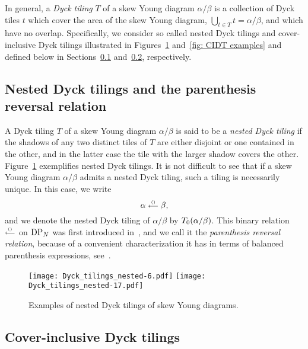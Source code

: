 \documentclass[oneside,english]{amsart}
\numberwithin{equation}{section}
\numberwithin{figure}{section}
\theoremstyle{plain}
\theoremstyle{plain}
\theoremstyle{plain}
\theoremstyle{remark}
\theoremstyle{plain}
\theoremstyle{plain}
\theoremstyle{plain}
\theoremstyle{plain}
\theoremstyle{plain}
\theoremstyle{plain}
\theoremstyle{plain}
\theoremstyle{plain}
\begin{document}
In general, a \emph{Dyck tiling} $T$ of a skew Young diagram $\alpha/\beta$ is a collection
of Dyck tiles $t$ which cover the area of the skew Young diagram,
$\bigcup_{t \in T} t = \alpha/\beta$, and which have no overlap. 
Specifically, we consider
so called nested Dyck tilings and cover-inclusive Dyck tilings illustrated
in Figures~\ref{fig: NDT examples} and~\ref{fig: CIDT examples} %
and defined below 
in Sections~\ref{sub: nested  DT} and~\ref{sub: cover-inclusive DT}, respectively.



\subsection{Nested Dyck tilings and the parenthesis reversal relation}
\label{sub: nested  DT}

A Dyck tiling $T$ of a skew Young diagram $\alpha/\beta$ is said to be a \emph{nested
Dyck tiling} if the shadows of any two distinct tiles of $T$ are either disjoint
or one contained in the other, and in the latter case the tile with the larger
shadow covers the other. Figure~\ref{fig: NDT examples} exemplifies nested Dyck
tilings. It is not difficult to see that if a skew Young diagram $\alpha/\beta$ admits a
nested Dyck tiling, such a tiling is necessarily unique.
In this case, we write \[ \alpha \stackrel{\scriptscriptstyle{()}}{\scriptstyle{\longleftarrow}} \beta , \] and 
we denote the nested Dyck tiling of $\alpha/\beta$ %
by $T_0 (\alpha / \beta)$.
This binary relation~$\stackrel{\scriptscriptstyle{()}}{\scriptstyle{\longleftarrow}}$ on $\mathrm{DP}_N$ was first introduced
in~\cite{KW-double_dimer_pairings_and_skew_Young_diagrams, SZ-path_representations_of_maximal_paraboloc_KL_polynomials},
and we %
call it the \emph{parenthesis reversal relation}, because of a
convenient characterization it has in terms of balanced parenthesis expressions,
see~\cite[Lemma~2.7]{KKP-boundary_correlations_in_planar_LERW_and_UST}.
%
\begin{figure}
\texttt{[image: Dyck\_tilings\_nested-6.pdf]} \quad
\texttt{[image: Dyck\_tilings\_nested-17.pdf]}
\caption{\label{fig: NDT examples} Examples of nested Dyck tilings of skew Young diagrams.}
\end{figure}

\subsection{Cover-inclusive Dyck tilings}
\label{sub: cover-inclusive DT}
\end{document}
